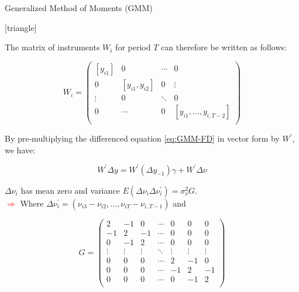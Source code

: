 \documentclass{beamer}
\begin{document}
\begin{frame}{Generalized Method of Moments (GMM)}

[triangle]
\begin{itemize} 
{\scriptsize\item The matrix of instruments $W_i$ for period $T$ can therefore be written as follows:}

\begin{tiny}
\begin{equation} \label{eq:GMM-Matrix}
W_i = \left( \begin{array}{cccc}
[y_{i1}] & 0 & \cdots & 0 \\
0 & [y_{i1}, y_{i2}] & 0 & \vdots \\
\vdots & 0 & \ddots & 0 \\
0 & \cdots & 0 & [y_{i1}, \dotsc, y_{i,T-2}] \\
\end{array}\right)
\end{equation}
\end{tiny}

{\scriptsize\item By pre-multiplying the differenced equation \eqref{eq:GMM-FD} in vector form by $W^{\prime}$, we have:}

\begin{scriptsize}
\begin{equation} \label{eq:GMM-Vector}
W^{\prime} \Delta y = W^{\prime} (\Delta y_{-1})\gamma + W^{\prime} \Delta \nu
\end{equation}
\end{scriptsize}

\vspace{-10pt} 
{\scriptsize\item $\Delta \nu_i$ has mean zero and variance $E(\Delta \nu_i \Delta \nu_i^{\prime})= \sigma^2_{\nu} G$.
\vspace{-7pt} 
\\ \tiny\textcolor{red}{$\Longrightarrow$} Where $\Delta \nu_i^{\prime} = (\nu_{i3} - \nu_{i2}, \dotsc, \nu_{iT} - \nu_{i,T-1})$ and}

\begin{tiny}
\begin{equation} \label{eq:GMM-Matrix}
G = \left( \begin{array}{ccccccc}
2 & -1 & 0 & \cdots & 0 & 0 & 0 \\
-1 & 2 & -1 & \cdots & 0 & 0 & 0 \\
0 & -1 & 2 & \cdots & 0 & 0 & 0 \\
\vdots & \vdots  & \vdots & \ddots & \vdots & \vdots & \vdots \\
0 & 0  & 0  & \cdots & 2 & -1 & 0 \\
0 & 0  & 0  & \cdots & -1 & 2 & -1 \\
0 & 0  & 0  & \cdots & 0 & -1 & 2 \\
\end{array}\right)
\end{equation}
\end{tiny}
\end{itemize}
\end{frame}
\end{document}
